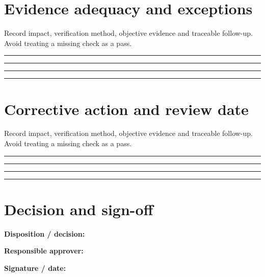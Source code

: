 \documentclass[10pt,letterpaper]{article}
\begin{document}
\section{Evidence adequacy and exceptions}
Record impact, verification method, objective evidence and traceable follow-up. Avoid treating a missing check as a pass.\par\medskip
\noindent\rule{\linewidth}{0.4pt}\par\vspace{16pt}
\noindent\rule{\linewidth}{0.4pt}\par\vspace{16pt}
\noindent\rule{\linewidth}{0.4pt}\par\vspace{16pt}
\noindent\rule{\linewidth}{0.4pt}\par\vspace{16pt}
\section{Corrective action and review date}
Record impact, verification method, objective evidence and traceable follow-up. Avoid treating a missing check as a pass.\par\medskip
\noindent\rule{\linewidth}{0.4pt}\par\vspace{16pt}
\noindent\rule{\linewidth}{0.4pt}\par\vspace{16pt}
\noindent\rule{\linewidth}{0.4pt}\par\vspace{16pt}
\noindent\rule{\linewidth}{0.4pt}\par\vspace{16pt}
\section{Decision and sign-off}
\noindent\textbf{Disposition / decision:}\quad\hrulefill\par\vspace{11pt}
\noindent\textbf{Responsible approver:}\quad\hrulefill\par\vspace{11pt}
\noindent\textbf{Signature / date:}\quad\hrulefill\par\vspace{11pt}
\end{document}
